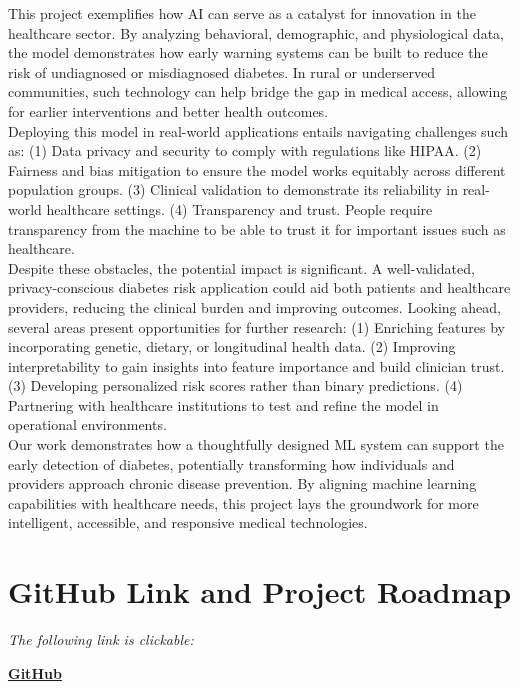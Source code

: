 \documentclass[conference]{IEEEtran}
\begin{document}
This project exemplifies how AI can serve as a catalyst for innovation in the healthcare sector. By analyzing behavioral, demographic, and physiological data, the model demonstrates how early warning systems can be built to reduce the risk of undiagnosed or misdiagnosed diabetes. In rural or underserved communities, such technology can help bridge the gap in medical access, allowing for earlier interventions and better health outcomes. \\

Deploying this model in real-world applications entails navigating challenges such as: (1) Data privacy and security to comply with regulations like HIPAA. (2) Fairness and bias mitigation to ensure the model works equitably across different population groups. (3) Clinical validation to demonstrate its reliability in real-world healthcare settings. (4) Transparency and trust. People require transparency from the machine to be able to trust it for important issues such as healthcare. \\

Despite these obstacles, the potential impact is significant. A well-validated, privacy-conscious diabetes risk application could aid both patients and healthcare providers, reducing the clinical burden and improving outcomes. Looking ahead, several areas present opportunities for further research: (1) Enriching features by incorporating genetic, dietary, or longitudinal health data. (2) Improving interpretability to gain insights into feature importance and build clinician trust. (3) Developing personalized risk scores rather than binary predictions. (4) Partnering with healthcare institutions to test and refine the model in operational environments.\\ 

Our work demonstrates how a thoughtfully designed ML system can support the early detection of diabetes, potentially transforming how individuals and providers approach chronic disease prevention. By aligning machine learning capabilities with healthcare needs, this project lays the groundwork for more intelligent, accessible, and responsive medical technologies.

\section{GitHub Link and Project Roadmap}

\vspace{1em}
\noindent \textit{The following link is clickable:}
\begin{center}
\href{https://github.com/LJMurphyy/diabetes-risk-predictor.git}{\textbf{GitHub}}
\end{center}
\end{document}
